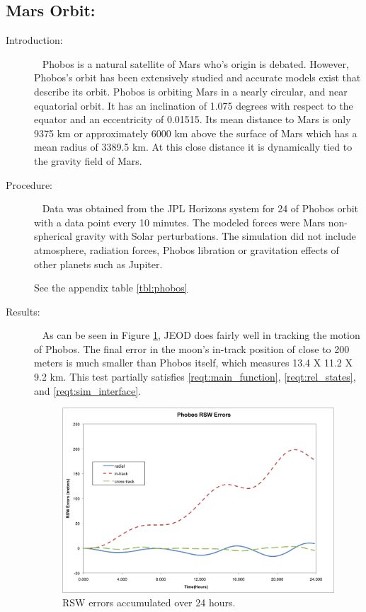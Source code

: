 \subsection{Mars Orbit: }
\label{test:phobos}
\begin{description}
\item[Introduction:] \ \newline
Phobos is a natural satellite of Mars who's origin is  debated. However, Phobos's orbit has
been extensively studied and accurate models exist that describe its orbit. Phobos is orbiting
Mars in a nearly circular, and near equatorial orbit.  It has an inclination of 1.075 degrees
with respect to the equator and an eccentricity of 0.01515.  Its mean distance to Mars is only
9375 km or approximately 6000 km above the surface of Mars which has a mean radius of 3389.5 km.
At this close distance it is dynamically tied to the gravity field of Mars.
\item[Procedure:]\ \newline
Data was obtained from the JPL Horizons system for 24 of Phobos orbit with a data point every 10
minutes. The modeled forces were Mars non-spherical gravity with Solar perturbations. The simulation
did not include atmosphere, radiation forces, Phobos libration or gravitation effects of other
planets such as Jupiter.

See the appendix table \ref{tbl:phobos}
\item[Results:]\ \newline
As can be seen in Figure \ref{fig:10}, JEOD does fairly well in tracking the motion of Phobos.
The final error in the moon's in-track position of close to 200 meters is much smaller than Phobos
itself, which measures 13.4 X 11.2 X 9.2 km. This test partially satisfies \ref{reqt:main_function},
\ref{reqt:rel_states}, and \ref{reqt:sim_interface}.


\begin{figure}
\begin{center}
\includegraphics [width=7.0in]{figs/phobos/phobos_err.png}
\end{center}
\caption{RSW errors accumulated over 24 hours.}
\label{fig:10}
\end{figure}

\end{description}
\clearpage
\newpage

